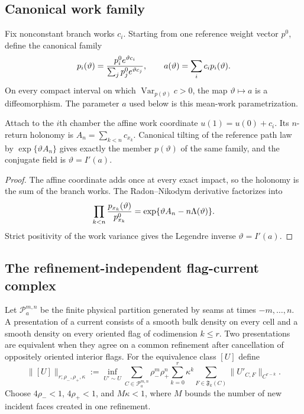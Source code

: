 \subsection{Canonical work family}

Fix nonconstant branch works $c_i$.  Starting from one reference weight vector
$p^0$, define the canonical family
\[
 p_i(\vartheta)=
 {p_i^0e^{\vartheta c_i}\over
  \sum_jp_j^0e^{\vartheta c_j}},
 \qquad
 a(\vartheta)=\sum_i c_i p_i(\vartheta).
\]
On every compact interval on which
$\operatorname{Var}_{p(\vartheta)}c>0$, the map
$\vartheta\mapsto a$ is a diffeomorphism.  The parameter $a$ used below is
this mean-work parametrization.

\begin{proposition}
\label{prop:r13-a1-work}
Attach to the $i$th chamber the affine work coordinate
$u(1)=u(0)+c_i$.  Its $n$-return holonomy is
$A_n=\sum_{k<n}c_{x_k}$.  Canonical tilting of the reference path law by
$\exp\{\vartheta A_n\}$ gives exactly the member $p(\vartheta)$ of the
same family, and the conjugate field is
$\vartheta=I'(a)$.
\end{proposition}

\begin{proof}
The affine coordinate adds once at every exact impact, so the holonomy is the
sum of the branch works.  The Radon--Nikodym derivative factorizes into
\[
 \prod_{k<n}{p_{x_k}(\vartheta)\over p_{x_k}^0}
 =\exp\{\vartheta A_n-n\Lambda(\vartheta)\}.
\]
Strict positivity of the work variance gives the Legendre inverse
$\vartheta=I'(a)$.
\end{proof}

\subsection{The refinement-independent flag-current complex}

Let $\mathscr P^{m,n}_a$ be the finite physical partition generated by seams
at times $-m,\ldots,n$.  A presentation of a current consists of a smooth
bulk density on every cell and a smooth density on every oriented flag of
codimension $k\le r$.  Two presentations are equivalent when they agree on a
common refinement after cancellation of oppositely oriented interior flags.
For the equivalence class $[U]$ define
\[
 \|[U]\|_{r;\rho_-,\rho_+,\kappa}
 :=\inf_{U'\sim U}
 \sum_{C\in\mathscr P^{m,n}_a}
 \rho_-^{m}\rho_+^{n}
 \sum_{k=0}^{r}\kappa^k
 \sum_{F\in\mathfrak F_k(C)}
 \|U'_{C,F}\|_{C^{r-k}}.
\]
Choose $4\rho_-<1$, $4\rho_+<1$, and $M\kappa<1$, where $M$ bounds the
number of new incident faces created in one refinement.

